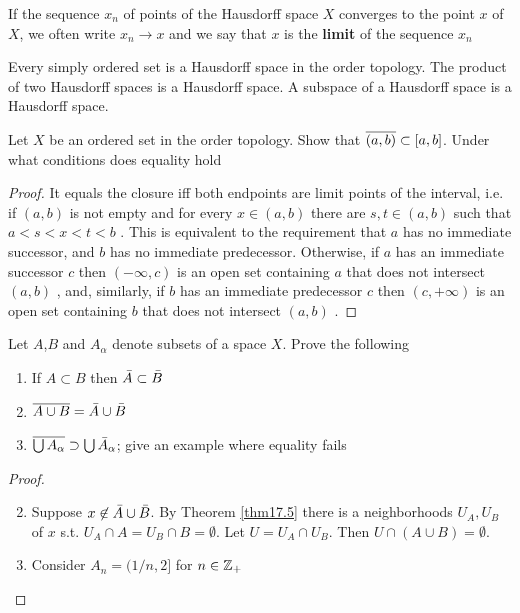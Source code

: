 \documentclass[11pt]{article}
\begin{document}
If the sequence \(x_n\) of points of the Hausdorff space \(X\) converges to the point \(x\)
of \(X\), we often write \(x_n\to x\) and we say that \(x\) is the \textbf{limit} of the sequence \(x_n\)

\begin{theorem}[]
Every simply ordered set is a Hausdorff space in the order topology. The product of two Hausdorff
spaces is a Hausdorff space. A subspace of a Hausdorff space is a Hausdorff space.
\end{theorem}

\begin{exercise}
\label{ex17.5}
Let \(X\) be an ordered set in the order topology. Show that \(\overline{(a,b)}\subset[a,b]\). Under what
conditions does equality hold
\end{exercise}

\begin{proof}
It equals the closure iff both endpoints are limit points of the interval, i.e. if \((a,b)\) is not
empty and for every \(x\in(a,b)\) there are \(s,t\in(a,b)\) such that \(a<s<x<t<b\) . This is equivalent to the
requirement that \(a\) has no immediate successor, and \(b\) has no immediate predecessor. Otherwise, if
\(a\) has an immediate successor \(c\) then \((−∞,c)\) is an open set containing \(a\) that does not intersect
\((a,b)\) , and, similarly, if \(b\) has an immediate predecessor \(c\) then \((c,+∞)\) is an open set containing
\(b\) that does not intersect \((a,b)\) .
\end{proof}

\begin{exercise}
\label{ex17.6}
Let \(A\),\(B\) and \(A_\alpha\) denote subsets of a space \(X\). Prove the following
\begin{enumerate}
\item If \(A\subset B\) then \(\bar{A}\subset\bar{B}\)
\item \(\overline{A\cup B}=\bar{A}\cup\bar{B}\)
\item \(\overline{\bigcup A_\alpha}\supset\bigcup\bar{A}_\alpha\); give an example where equality fails
\end{enumerate}
\end{exercise}

\begin{proof}
\begin{enumerate}
\setcounter{enumi}{1}
\item Suppose \(x\not\in\bar{A}\cup\bar{B}\). By Theorem \ref{thm17.5} there is a neighborhoods \(U_A,U_B\)
of \(x\) s.t. \(U_A\cap A=U_B\cap B=\emptyset\).  Let \(U=U_A\cap U_B\). Then \(U\cap(A\cup B)=\emptyset\).
\item Consider \(A_n=(1/n,2]\) for \(n\in\mathbb{Z}_+\)
\end{enumerate}
\end{proof}
\end{document}
